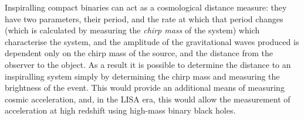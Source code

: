 Inspiralling compact binaries can act as a cosmological distance
measure: they have two parameters, their period, and the rate at which
that period changes (which is calculated by measuring the \emph{chirp
  mass} of the system) which characterise the system, and the
amplitude of the gravitational waves produced is dependent only on the
chirp mass of the source, and the distance from the observer to the
object. As a result it is possible to determine the distance to an
inspiralling system simply by determining the chirp mass and measuring
the brightness of the event. This would provide an additional means of
measuring cosmic acceleration, and, in the LISA era, this would allow
the measurement of acceleration at high redshift using high-mass
binary black holes.


